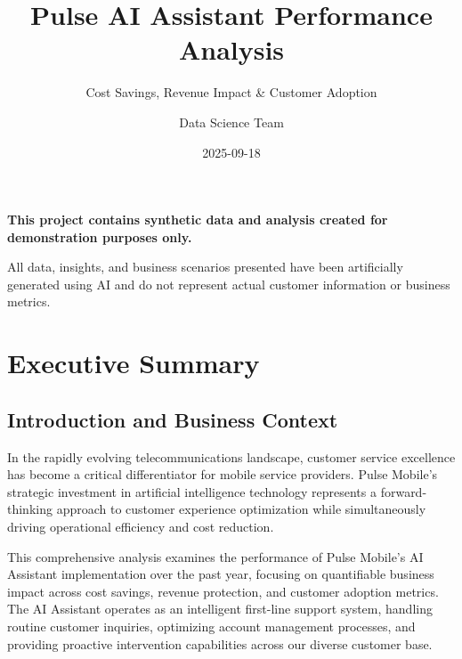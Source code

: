 \documentclass[
  letterpaper,
  DIV=11,
  numbers=noendperiod]{scrartcl}
\title{Pulse AI Assistant Performance Analysis}
\subtitle{Cost Savings, Revenue Impact \& Customer Adoption}
\author{Data Science Team}
\date{2025-09-18}
\begin{document}
\maketitle


\begin{tcolorbox}[enhanced jigsaw, coltitle=black, colbacktitle=quarto-callout-important-color!10!white, colframe=quarto-callout-important-color-frame, rightrule=.15mm, arc=.35mm, leftrule=.75mm, toptitle=1mm, breakable, bottomtitle=1mm, titlerule=0mm, toprule=.15mm, opacityback=0, title=\textcolor{quarto-callout-important-color}{\faExclamation}\hspace{0.5em}{Important Disclaimer}, colback=white, bottomrule=.15mm, left=2mm, opacitybacktitle=0.6]

\textbf{This project contains synthetic data and analysis created for
demonstration purposes only.}

All data, insights, and business scenarios presented have been
artificially generated using AI and do not represent actual customer
information or business metrics.

\end{tcolorbox}

\section{Executive Summary}\label{executive-summary}

\subsection{Introduction and Business
Context}\label{introduction-and-business-context}

In the rapidly evolving telecommunications landscape, customer service
excellence has become a critical differentiator for mobile service
providers. Pulse Mobile's strategic investment in artificial
intelligence technology represents a forward-thinking approach to
customer experience optimization while simultaneously driving
operational efficiency and cost reduction.

This comprehensive analysis examines the performance of Pulse Mobile's
AI Assistant implementation over the past year, focusing on quantifiable
business impact across cost savings, revenue protection, and customer
adoption metrics. The AI Assistant operates as an intelligent first-line
support system, handling routine customer inquiries, optimizing account
management processes, and providing proactive intervention capabilities
across our diverse customer base.
\end{document}
